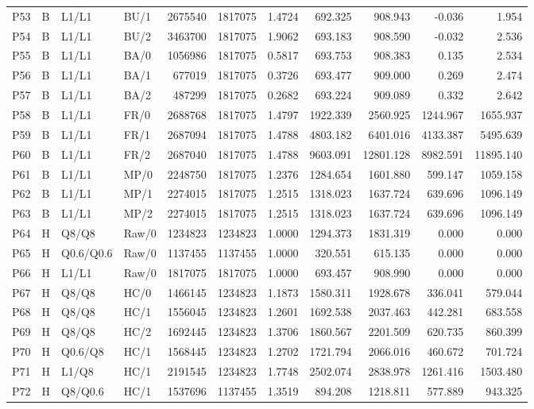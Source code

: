 \begin{longtable}{llllrrrrrrr}
P53 & B & L1/L1 & BU/1 & 2675540 & 1817075 & 1.4724 & 692.325 & 908.943 & -0.036 & 1.954\\
P54 & B & L1/L1 & BU/2 & 3463700 & 1817075 & 1.9062 & 693.183 & 908.590 & -0.032 & 2.536\\
P55 & B & L1/L1 & BA/0 & 1056986 & 1817075 & 0.5817 & 693.753 & 908.383 & 0.135 & 2.534\\
P56 & B & L1/L1 & BA/1 & 677019 & 1817075 & 0.3726 & 693.477 & 909.000 & 0.269 & 2.474\\
P57 & B & L1/L1 & BA/2 & 487299 & 1817075 & 0.2682 & 693.224 & 909.089 & 0.332 & 2.642\\
P58 & B & L1/L1 & FR/0 & 2688768 & 1817075 & 1.4797 & 1922.339 & 2560.925 & 1244.967 & 1655.937\\
P59 & B & L1/L1 & FR/1 & 2687094 & 1817075 & 1.4788 & 4803.182 & 6401.016 & 4133.387 & 5495.639\\
P60 & B & L1/L1 & FR/2 & 2687040 & 1817075 & 1.4788 & 9603.091 & 12801.128 & 8982.591 & 11895.140\\
P61 & B & L1/L1 & MP/0 & 2248750 & 1817075 & 1.2376 & 1284.654 & 1601.880 & 599.147 & 1059.158\\
P62 & B & L1/L1 & MP/1 & 2274015 & 1817075 & 1.2515 & 1318.023 & 1637.724 & 639.696 & 1096.149\\
P63 & B & L1/L1 & MP/2 & 2274015 & 1817075 & 1.2515 & 1318.023 & 1637.724 & 639.696 & 1096.149\\
P64 & H & Q8/Q8 & Raw/0 & 1234823 & 1234823 & 1.0000 & 1294.373 & 1831.319 & 0.000 & 0.000\\
P65 & H & Q0.6/Q0.6 & Raw/0 & 1137455 & 1137455 & 1.0000 & 320.551 & 615.135 & 0.000 & 0.000\\
P66 & H & L1/L1 & Raw/0 & 1817075 & 1817075 & 1.0000 & 693.457 & 908.990 & 0.000 & 0.000\\
P67 & H & Q8/Q8 & HC/0 & 1466145 & 1234823 & 1.1873 & 1580.311 & 1928.678 & 336.041 & 579.044\\
P68 & H & Q8/Q8 & HC/1 & 1556045 & 1234823 & 1.2601 & 1692.538 & 2037.463 & 442.281 & 683.558\\
P69 & H & Q8/Q8 & HC/2 & 1692445 & 1234823 & 1.3706 & 1860.567 & 2201.509 & 620.735 & 860.399\\
P70 & H & Q0.6/Q8 & HC/1 & 1568445 & 1234823 & 1.2702 & 1721.794 & 2066.016 & 460.672 & 701.724\\
P71 & H & L1/Q8 & HC/1 & 2191545 & 1234823 & 1.7748 & 2502.074 & 2838.978 & 1261.416 & 1503.480\\
P72 & H & Q8/Q0.6 & HC/1 & 1537696 & 1137455 & 1.3519 & 894.208 & 1218.811 & 577.889 & 943.325\\

\end{longtable}
